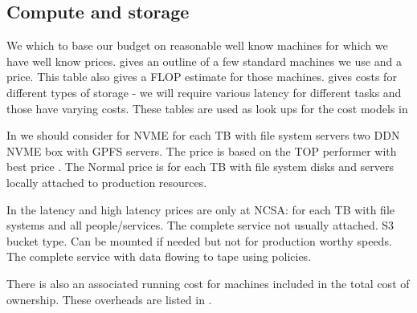 

\subsection{Compute and storage }\label{sec:csmodel}
We which to base our budget on reasonable well know machines for which we have well know prices.
 gives an outline of a few standard machines we use and a price. This table also gives a FLOP estimate
for those machines.
 gives costs for different types of storage - we will require various latency for different tasks
and those have varying costs.
These tables are used as look ups for the cost models in 



In  we should consider for NVME for each TB with file system servers two DDN NVME box with GPFS servers.
The price is based on the TOP performer with best price .
The Normal price is for each TB with file system disks and servers locally attached to production resources.

In the latency and high latency prices are only at NCSA: for each TB with file systems and all people/services.
The complete service not usually attached.   S3 bucket type.
Can be mounted if needed but not for production worthy speeds.
The complete service with data flowing to tape using policies.



There is also an associated running cost for machines included in the total cost of ownership.
These overheads are listed in .




